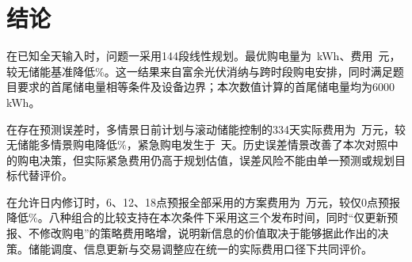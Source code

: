 \section{结论}
在已知全天输入时，问题一采用144段线性规划。最优购电量为\QoneGrid\ kWh、费用\QoneCost\ 元，较无储能基准降低\SavingPercent\%。这一结果来自富余光伏消纳与跨时段购电安排，同时满足题目要求的首尾储电量相等条件及设备边界；本次数值计算的首尾储电量均为6000 kWh。

在存在预测误差时，多情景日前计划与滚动储能控制的334天实际费用为\QtwoCost\ 万元，较无储能多情景购电降低\QtwoNoStorageSaving\%，紧急购电发生于\QtwoDays\ 天。历史误差情景改善了本次对照中的购电决策，但实际紧急费用仍高于规划估值，误差风险不能由单一预测或规划目标代替评价。

在允许日内修订时，6、12、18点预报全部采用的方案费用为\QthreeCost\ 万元，较仅0点预报降低\QthreeSaving\%。八种组合的比较支持在本次条件下采用这三个发布时间，同时“仅更新预报、不修改购电”的策略费用略增，说明新信息的价值取决于能够据此作出的决策。储能调度、信息更新与交易调整应在统一的实际费用口径下共同评价。
